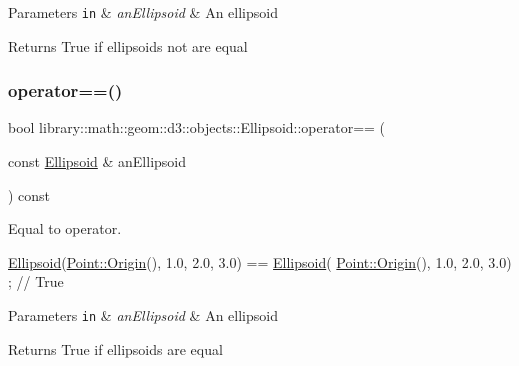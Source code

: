 \begin{DoxyParams}[1]{Parameters}
\mbox{\tt in}  & {\em an\+Ellipsoid} & An ellipsoid \\
\hline
\end{DoxyParams}
\begin{DoxyReturn}{Returns}
True if ellipsoids not are equal 
\end{DoxyReturn}
\mbox{\label{classlibrary_1_1math_1_1geom_1_1d3_1_1objects_1_1_ellipsoid_a259ca94e493d1e8694292aaa579ae1e7}} 
\subsubsection{\texorpdfstring{operator==()}{operator==()}}
{\footnotesize\ttfamily bool library\+::math\+::geom\+::d3\+::objects\+::\+Ellipsoid\+::operator== (\begin{DoxyParamCaption}\item[{const \hyperlink{classlibrary_1_1math_1_1geom_1_1d3_1_1objects_1_1_ellipsoid}{Ellipsoid} \&}]{an\+Ellipsoid }\end{DoxyParamCaption}) const}



Equal to operator. 


\begin{DoxyCode}
\hyperlink{classlibrary_1_1math_1_1geom_1_1d3_1_1objects_1_1_ellipsoid_aae81fe0edc7f0e8d4590ea89ae73cb14}{Ellipsoid}(\hyperlink{classlibrary_1_1math_1_1geom_1_1d3_1_1objects_1_1_point_ab2a38e285c562e50bf350272c083986f}{Point::Origin}(), 1.0, 2.0, 3.0) == \hyperlink{classlibrary_1_1math_1_1geom_1_1d3_1_1objects_1_1_ellipsoid_aae81fe0edc7f0e8d4590ea89ae73cb14}{Ellipsoid}(
      \hyperlink{classlibrary_1_1math_1_1geom_1_1d3_1_1objects_1_1_point_ab2a38e285c562e50bf350272c083986f}{Point::Origin}(), 1.0, 2.0, 3.0) ; \textcolor{comment}{// True}
\end{DoxyCode}



\begin{DoxyParams}[1]{Parameters}
\mbox{\tt in}  & {\em an\+Ellipsoid} & An ellipsoid \\
\hline
\end{DoxyParams}
\begin{DoxyReturn}{Returns}
True if ellipsoids are equal 
\end{DoxyReturn}
\mbox{\label{classlibrary_1_1math_1_1geom_1_1d3_1_1objects_1_1_ellipsoid_abe9ead973befc80360179629fc96027a}} 
